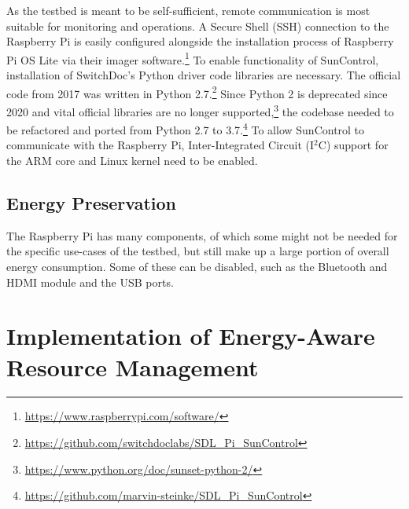 As the testbed is meant to be self-sufficient, remote communication is most
suitable for monitoring and operations. A Secure Shell (SSH) connection to the
Raspberry Pi is easily configured alongside the installation process of
Raspberry Pi OS Lite via their imager
software.\footnote{\url{https://www.raspberrypi.com/software/}} To enable
functionality of SunControl, installation of SwitchDoc's Python driver code
libraries are necessary. The official code from 2017 was written in Python
2.7.\footnote{\url{https://github.com/switchdoclabs/SDL_Pi_SunControl}} Since
Python 2 is deprecated since 2020 and vital official libraries are no longer
supported,\footnote{\url{https://www.python.org/doc/sunset-python-2/}} the
codebase needed to be refactored and ported from Python 2.7 to
3.7.\footnote{\url{https://github.com/marvin-steinke/SDL_Pi_SunControl}} To
allow SunControl to communicate with the Raspberry Pi, Inter-Integrated Circuit
(I$^2$C) support for the ARM core and Linux kernel need to be enabled.

\subsection{Energy Preservation}

The Raspberry Pi has many components, of which some might not be needed for the
specific use-cases of the testbed, but still make up a large portion of overall
energy consumption. Some of these can be disabled, such as the Bluetooth and
HDMI module and the USB ports. %


\section{Implementation of Energy-Aware Resource Management}
\label{sec:implementation_of_energy-aware_resource_management}

